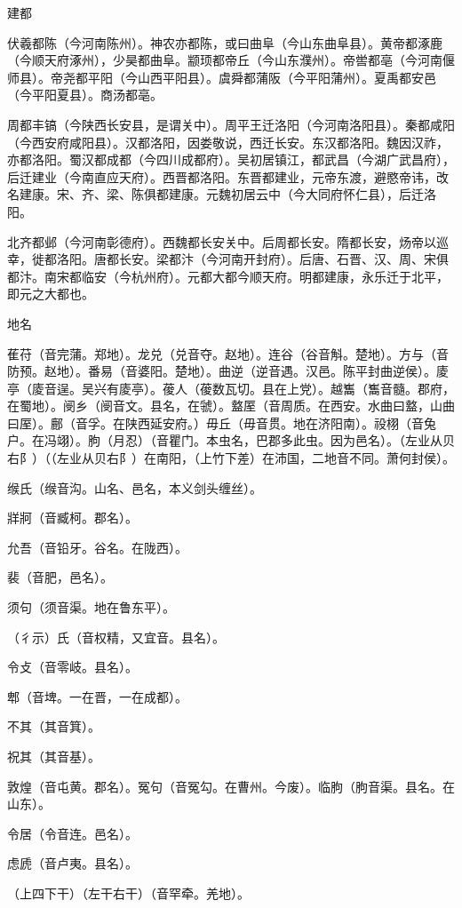 \documentclass[a4paper,12pt,UTF8,twoside]{ctexbook}
\begin{document}
	建都
	
	伏羲都陈（今河南陈州）。神农亦都陈，或曰曲阜（今山东曲阜县）。黄帝都涿鹿（今顺天府涿州），少昊都曲阜。颛顼都帝丘（今山东濮州）。帝喾都亳（今河南偃师县）。帝尧都平阳（今山西平阳县）。虞舜都蒲阪（今平阳蒲州）。夏禹都安邑（今平阳夏县）。商汤都亳。
	
	周都丰镐（今陕西长安县，是谓关中）。周平王迁洛阳（今河南洛阳县）。秦都咸阳（今西安府咸阳县）。汉都洛阳，因娄敬说，西迁长安。东汉都洛阳。魏因汉祚，亦都洛阳。蜀汉都成都（今四川成都府）。吴初居镇江，都武昌（今湖广武昌府），后迁建业（今南直应天府）。西晋都洛阳。东晋都建业，元帝东渡，避愍帝讳，改名建康。宋、齐、梁、陈俱都建康。元魏初居云中（今大同府怀仁县），后迁洛阳。
	
	北齐都邺（今河南彰德府）。西魏都长安关中。后周都长安。隋都长安，炀帝以巡幸，徙都洛阳。唐都长安。梁都汴（今河南开封府）。后唐、石晋、汉、周、宋俱都汴。南宋都临安（今杭州府）。元都大都今顺天府。明都建康，永乐迁于北平，即元之大都也。
	
	地名
	
	萑苻（音完蒲。郑地）。龙兑（兑音夺。赵地）。连谷（谷音斛。楚地）。方与（音防预。赵地）。番易（音婆阳。楚地）。曲逆（逆音遇。汉邑。陈平封曲逆侯）。庱亭（庱音逞。吴兴有庱亭）。葰人（葰数瓦切。县在上党）。越雟（雟音髓。郡府，在蜀地）。阌乡（阌音文。县名，在虢）。盩厔（音周质。在西安。水曲曰盩，山曲曰厔）。鄜（音孚。在陕西延安府。）毋丘（毋音贯。地在济阳南）。祋栩（音兔户。在冯翊）。朐（月忍）（音瞿门。本虫名，巴郡多此虫。因为邑名）。（左业从贝右阝）（（左业从贝右阝）在南阳，（上竹下差）在沛国，二地音不同。萧何封侯）。
	
	缑氏（缑音沟。山名、邑名，本义剑头缠丝）。
	
	牂牁（音臧柯。郡名）。
	
	允吾（音铅牙。谷名。在陇西）。
	
	裴（音肥，邑名）。
	
	须句（须音渠。地在鲁东平）。
	
	（彳示）氏（音权精，又宜音。县名）。
	
	令攴（音零岐。县名）。
	
	郫（音埤。一在晋，一在成都）。
	
	不其（其音箕）。
	
	祝其（其音基）。
	
	敦煌（音屯黄。郡名）。冤句（音冤勾。在曹州。今废）。临朐（朐音渠。县名。在山东）。
	
	令居（令音连。邑名）。
	
	虑虒（音卢夷。县名）。
	
	（上四下干）（左干右干）（音罕牵。羌地）。
	
\end{document}
